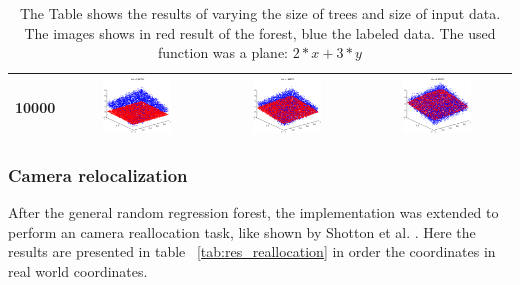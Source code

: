 \begin{landscape}
\begin{table}[p]
\begin{tabular}{|c|c|c|c|}
10000& \includegraphics[width=0.5\textwidth, height=0.35\textheight]{fig/plane_10k_50} & \includegraphics[width=0.5\textwidth, height=0.35\textheight]{fig/plane_10k_150} & \includegraphics[width=0.5\textwidth, height=0.35\textheight]{fig/plane_10k_1500} \\ \hline
\bottomrule
\end{tabular}
\caption{The Table shows the results of varying the size of trees and size of input data. The images shows in red result of the forest, blue the labeled data. The used function was a plane: $2*x + 3*y$}
\label{tab:res_gen_plane}
\end{table}

\end{landscape}

\subsubsection*{Camera relocalization} %
\label{ssub:relocalization}
After the general random regression forest, the implementation was extended to perform an camera reallocation task, like shown by Shotton et al. \cite{shotton}. Here the results are presented in table ~\ref{tab:res_reallocation} in order the coordinates in real world coordinates.

